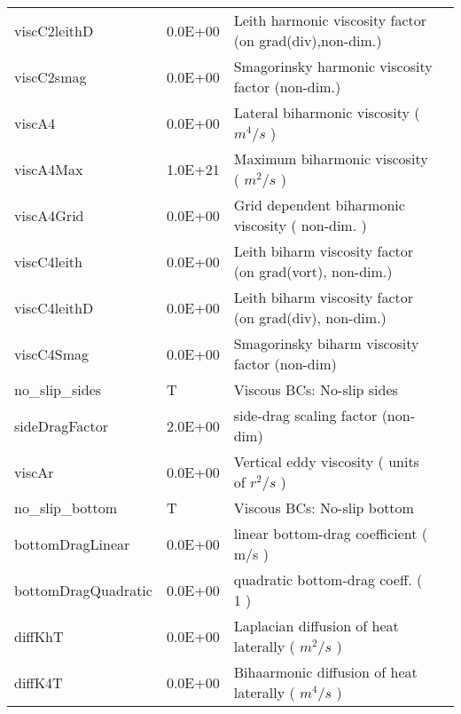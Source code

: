 \begin{table}
\begin{tabular}{lllc}
   viscC2leithD   &                   0.0E+00
    &   Leith harmonic viscosity factor (on grad(div),non-dim.) 
    &  %
    \\
   viscC2smag   &                   0.0E+00
    &   Smagorinsky harmonic viscosity factor (non-dim.) 
    &  %
    \\
   viscA4   &                   0.0E+00
    &   Lateral biharmonic viscosity ( $m^4/s$ ) 
    &  %
    \\
   viscA4Max   &                   1.0E+21
    &   Maximum biharmonic viscosity ( $m^2/s$ ) 
    &  %
    \\
   viscA4Grid   &                   0.0E+00
    &   Grid dependent biharmonic viscosity ( non-dim. ) 
    &  %
    \\
   viscC4leith   &                   0.0E+00
    &   Leith biharm viscosity factor (on grad(vort), non-dim.) 
    &  %
    \\
   viscC4leithD   &                   0.0E+00
    &   Leith biharm viscosity factor (on grad(div), non-dim.) 
    &  %
    \\
   viscC4Smag   &                   0.0E+00
    &   Smagorinsky biharm viscosity factor (non-dim) 
    &  %
    \\
   no\_slip\_sides   &                     T
    &   Viscous BCs: No-slip sides 
    &  %
    \\
   sideDragFactor   &                   2.0E+00
    &   side-drag scaling factor (non-dim) 
    &  %
    \\
   viscAr   &                   0.0E+00
    &   Vertical eddy viscosity ( units of $r^2/s$ ) 
    &  %
    \\
   no\_slip\_bottom   &                     T
    &   Viscous BCs: No-slip bottom 
    &  %
    \\
   bottomDragLinear   &                   0.0E+00
    &   linear bottom-drag coefficient ( m/s ) 
    &  %
    \\
   bottomDragQuadratic   &                   0.0E+00
    &   quadratic bottom-drag coeff. ( 1 ) 
    &  %
    \\
   diffKhT   &                   0.0E+00
    &   Laplacian diffusion of heat laterally ( $m^2/s$ ) 
    &  %
    \\
   diffK4T   &                   0.0E+00
    &   Bihaarmonic diffusion of heat laterally ( $m^4/s$ ) 
    &  %
    \\

\end{tabular}
\end{table}

